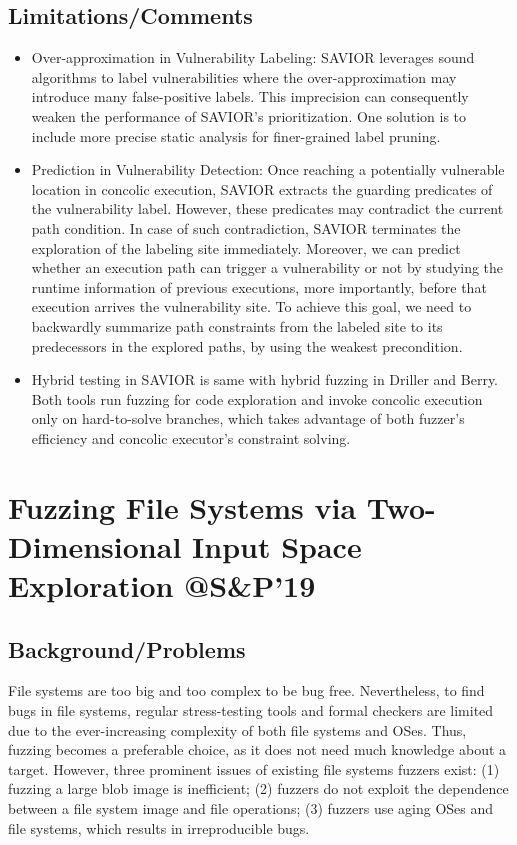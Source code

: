 \subsection{Limitations/Comments}
\begin{itemize}
    \item Over-approximation in Vulnerability Labeling: SAVIOR leverages sound algorithms to label vulnerabilities where the over-approximation may introduce many false-positive labels. This imprecision can consequently weaken the performance of SAVIOR's prioritization.  One solution is to include more precise static analysis for finer-grained label pruning.
    \item Prediction in Vulnerability Detection: Once reaching a potentially vulnerable location in concolic execution, SAVIOR extracts the guarding predicates of the vulnerability label. However, these predicates may contradict the current path condition. In case of such contradiction, SAVIOR terminates the exploration of the labeling site immediately.  Moreover, we can predict whether an execution path can trigger a vulnerability or not by studying the runtime information of previous executions, more importantly, before that execution arrives the vulnerability site. To achieve this goal, we need to backwardly summarize path constraints from the labeled site to its predecessors in the explored paths, by using the weakest precondition.
    \item Hybrid testing in SAVIOR is same with hybrid fuzzing in Driller and Berry. Both tools run fuzzing for code exploration and invoke concolic execution only on hard-to-solve branches, which takes advantage of both fuzzer's efficiency and concolic executor's constraint solving.
\end{itemize}
\newpage
\section{Fuzzing File Systems via Two-Dimensional Input Space Exploration @S\&P'19}
\subsection{Background/Problems}
File systems are too big and too complex to be bug free. Nevertheless, to find bugs in file systems, regular stress-testing tools and formal checkers are limited due to the ever-increasing complexity of both file systems and OSes. Thus, fuzzing becomes a preferable choice, as it does not need much knowledge about a target. However, three prominent issues of existing file systems fuzzers exist: (1) fuzzing a large blob image is inefficient; (2) fuzzers do not exploit the dependence between a file system image and file operations; (3) fuzzers use aging OSes and file systems, which results in irreproducible bugs.

